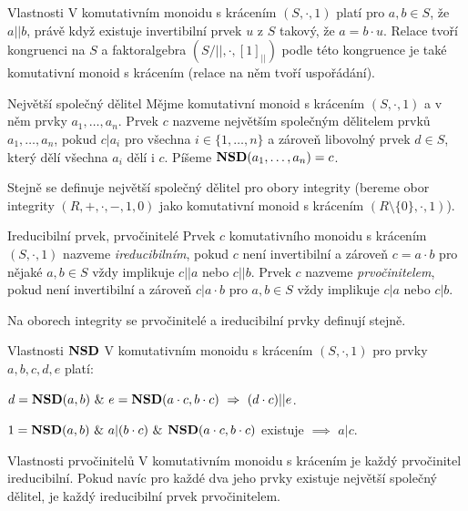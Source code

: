 \begin{poznamkaN}{Vlastnosti \uv{$||$}}
V komutativním monoidu s krácením $(S,\cdot,1)$ platí pro $a,b\in S$, že $a||b$, právě když existuje invertibilní prvek $u$ z $S$  takový, že $a=b\cdot u$. Relace \uv{$||$} tvoří kongruenci na $S$ a faktoralgebra $(S/||,\cdot,[1]_{||})$ podle této kongruence je také komutativní monoid s krácením (relace \uv{$|$} na něm tvoří uspořádání).
\end{poznamkaN}


\begin{definiceN}{Největší společný dělitel}
Mějme komutativní monoid s krácením $(S,\cdot,1)$ a v něm prvky $a_1,\dots,a_n$. Prvek $c$ nazveme největším společným dělitelem prvků $a_1,\dots,a_n$, pokud $c|a_i$ pro všechna $i\in\{1,\dots,n\}$ a zároveň libovolný prvek $d\in S$, který dělí všechna $a_i$ dělí i $c$. Píšeme $\mathbf{NSD}(a_1,\dots,a_n)=c$. 

Stejně se definuje největší společný dělitel pro obory integrity (bereme obor integrity $(R,+,\cdot,-,1,0)$ jako komutativní monoid s krácením $(R\setminus\{0\},\cdot,1)$).
\end{definiceN}

\begin{definiceN}{Ireducibilní prvek, prvočinitelé}
Prvek $c$ komutativního monoidu s krácením $(S,\cdot,1)$ nazveme \emph{ireducibilním}, pokud $c$ není invertibilní a zároveň $c=a\cdot b$ pro nějaké $a,b\in S$ vždy implikuje $c||a$ nebo $c||b$. Prvek $c$ nazveme \emph{prvočinitelem}, pokud není invertibilní a zároveň $c|a\cdot b$ pro $a,b\in S$ vždy implikuje $c|a$ nebo $c|b$. 

Na oborech integrity se prvočinitelé a ireducibilní prvky definují stejně.
\end{definiceN}


\begin{vetaN}{Vlastnosti $\mathbf{NSD}$}
V komutativním monoidu s krácením $(S,\cdot,1)$ pro prvky $a,b,c,d,e$ platí:
\begin{penumerate}
    \item $d=\mathbf{NSD}(a,b)\ \&\ e=\mathbf{NSD}(a\cdot c,b\cdot c) \ \Rightarrow\  (d\cdot c)||e$.
    \item $1=\NSD(a,b)\ \&\ a|(b\cdot c)\ \&$ $\mathbf{NSD}(a\cdot c,b\cdot c)$ existuje $\implies$ $a|c$.
\end{penumerate}
\end{vetaN}

\begin{vetaN}{Vlastnosti prvočinitelů}
V komutativním monoidu s krácením je každý prvočinitel ireducibilní. Pokud navíc pro každé dva jeho prvky existuje největší společný dělitel, je každý ireducibilní prvek prvočinitelem.
\end{vetaN}

